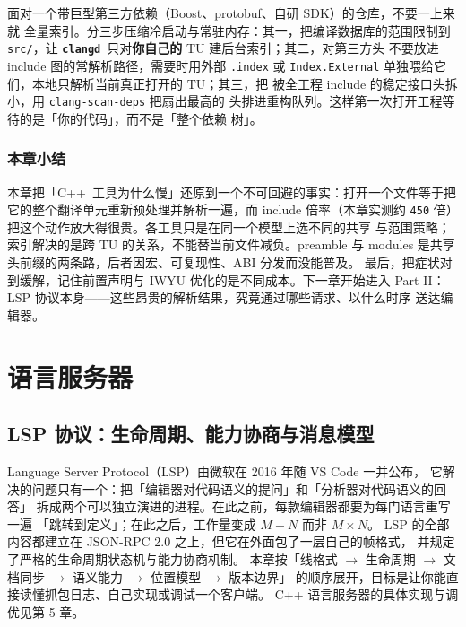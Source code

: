 \documentclass[12pt,a4paper,fontset=fandol]{ctexbook}
\newcommand{\Lib}[1]{\textbf{\texttt{#1}}}
\newcommand{\Lang}[1]{\textsf{#1}}
\newcommand{\CPP}{\Lang{C++}}
\newcommand{\CD}{\Lib{clangd}}
\begin{document}
\begin{bestpractice}[title={大仓库先只索引自己的 src，第三方头按需解析}]
面对一个带巨型第三方依赖（Boost、protobuf、自研 SDK）的仓库，不要一上来就
全量索引。分三步压缩冷启动与常驻内存：其一，把编译数据库的范围限制到
\texttt{src/}，让 \CD\ 只对\textbf{你自己的} TU 建后台索引；其二，对第三方头
不要放进 include 图的常解析路径，需要时用外部 \texttt{.index} 或
\texttt{Index.External} 单独喂给它们，本地只解析当前真正打开的 TU；其三，把
被全工程 include 的稳定接口头拆小，用 \texttt{clang-scan-deps} 把扇出最高的
头排进重构队列。这样第一次打开工程等待的是「你的代码」，而不是「整个依赖
树」。
\end{bestpractice}

\section*{本章小结}
本章把「\CPP\ 工具为什么慢」还原到一个不可回避的事实：打开一个文件等于把
它的整个翻译单元重新预处理并解析一遍，而 include 倍率（本章实测约
\texttt{450} 倍）把这个动作放大得很贵。各工具只是在同一个模型上选不同的共享
与范围策略；索引解决的是跨 TU 的关系，不能替当前文件减负。preamble 与
modules 是共享头前缀的两条路，后者因宏、可复现性、ABI 分发而没能普及。
最后，把症状对到缓解，记住前置声明与 IWYU 优化的是不同成本。下一章开始进入
Part II：LSP 协议本身——这些昂贵的解析结果，究竟通过哪些请求、以什么时序
送达编辑器。

\part{语言服务器}
\chapter{LSP 协议：生命周期、能力协商与消息模型}\label{ch:lsp-protocol}

Language Server Protocol（LSP）由微软在 2016 年随 VS Code 一并公布，
它解决的问题只有一个：把「编辑器对代码语义的提问」和「分析器对代码语义的回答」
拆成两个可以独立演进的进程。在此之前，每款编辑器都要为每门语言重写一遍
「跳转到定义」；在此之后，工作量变成 $M+N$ 而非 $M\times N$。
LSP 的全部内容都建立在 JSON-RPC 2.0 之上，但它在外面包了一层自己的帧格式，
并规定了严格的生命周期状态机与能力协商机制。
本章按「线格式 $\to$ 生命周期 $\to$ 文档同步 $\to$ 语义能力 $\to$ 位置模型 $\to$ 版本边界」
的顺序展开，目标是让你能直接读懂抓包日志、自己实现或调试一个客户端。
\CPP{} 语言服务器的具体实现与调优见第 5 章。
\end{document}
